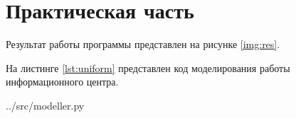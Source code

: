 \chapter{Практическая часть}

Результат работы программы представлен на рисунке \ref{img:res}. 


На листинге \ref{lst:uniform} представлен код моделирования работы информационного центра.

\begin{lstinputlisting}[label=lst:uniform,caption=Моделирование работы информационного центра, language=python]{../src/modeller.py}
\end{lstinputlisting}

